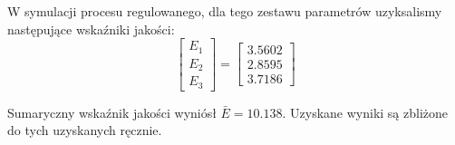 W symulacji procesu regulowanego, dla tego zestawu parametrów uzyksalismy następujące wskaźniki jakości:\\

\[
\begin{bmatrix}
    E_{\mathrm{1}} \\
    E_{\mathrm{2}} \\
    E_{\mathrm{3}} 
\end{bmatrix}
= 
\begin{bmatrix}
    \num{3.5602} \\
    \num{2.8595} \\
    \num{3.7186}
\end{bmatrix}
\]

Sumaryczny wskaźnik jakości wyniósł $\bar{E} = \num{10.138}$. Uzyskane wyniki są zbliżone 
do tych uzyskanych ręcznie. 



